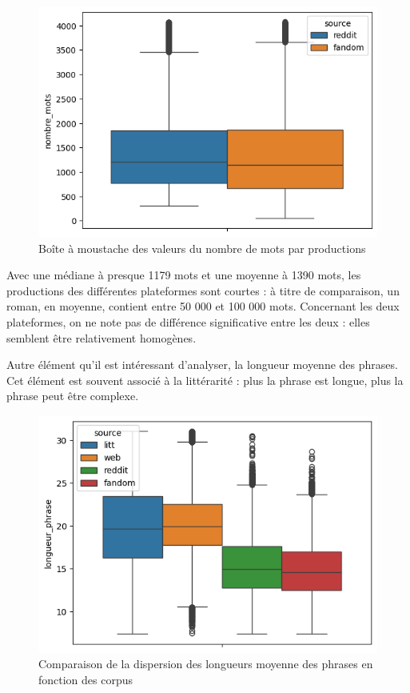 \documentclass[12pt,a4paper,oneside,titlepage]{book} %
\begin{document}
	\begin{figure}[htbp]
		\centering
		\includegraphics{illustration/boxplot_nombre_mots.png}
		\caption{Boîte à moustache des valeurs du nombre de mots par productions}
	\end{figure}
	
	Avec une médiane à presque 1179 mots et une moyenne à 1390 mots, les productions des différentes plateformes sont courtes : à titre de comparaison, un roman, en moyenne, contient entre 50 000 et 100 000 mots.
	Concernant les deux plateformes, on ne note pas de différence significative entre les deux : elles semblent être relativement homogènes. 
	
	Autre élément qu'il est intéressant d'analyser, la longueur moyenne des phrases. Cet élément est souvent associé à la littérarité : plus la phrase est longue, plus la phrase peut être complexe. 
	
		\begin{figure}[htbp]
		\centering
		\includegraphics{illustration/boxplot_phrases.png}
		\caption{Comparaison de la dispersion des longueurs moyenne des phrases en fonction des corpus}
	\end{figure}
	
\end{document}
